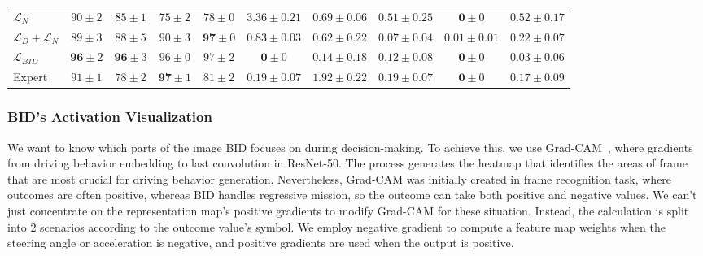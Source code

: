 \begin{table*}
\begin{tabular}{lccccccccc}
		$\mathcal{L}_N$
		& $90\pm2$ & $85\pm1$ & $75\pm2$  & $78\pm0$  
		& $3.36\pm0.21$ & $0.69\pm0.06$ & $0.51\pm0.25$  & $\mathbf{0}\pm0$  & $0.52\pm0.17$    \\
		$\mathcal{L}_D+\mathcal{L}_N$
		& $89 \pm 3$ & $88 \pm 5$  & $90 \pm 3$ & $\mathbf{97} \pm 0$  
		& $0.83 \pm 0.03$ & $0.62 \pm 0.22$ & $\mathbf{0.07} \pm 0.04$  &  $0.01 \pm 0.01$ & $0.22 \pm 0.07$    \\
		$\mathcal{L}_{BID}$
		& $\mathbf{96} \pm 2$ & $\mathbf{96} \pm 3$ & $96 \pm 0$ & $97 \pm 2$ 
		&  $\mathbf{0} \pm 0$ & $\mathbf{0.14} \pm 0.18$  & $0.12 \pm 0.08$  & $\mathbf{0} \pm 0$  & $\mathbf{0.03} \pm 0.06$  \\
		Expert
		& $91 \pm 1$ & $78 \pm 2$ & $\mathbf{97} \pm 1$ & $81 \pm 2$ 
		& $0.19 \pm 0.07$ & $1.92 \pm 0.22$  & $0.19 \pm 0.07$ & $\mathbf{0} \pm 0$ & $0.17 \pm 0.09$   \\
		\hline
	\end{tabular}
	\vspace{-1ex}
	\vspace{-2.5ex}
	\label{table:infraction}
\end{table*}


\subsubsection{BID's Activation Visualization}
\label{sec:Visualization}
\hspace{1pc}We want to know which parts of the image BID focuses on during decision-making. 
To achieve this, we use Grad-CAM~\cite{Selvaraju:2017}, where gradients from driving behavior embedding to last convolution in ResNet-50. 
The process generates the heatmap that identifies the areas of frame that are most crucial for driving behavior generation. 
Nevertheless, Grad-CAM was initially created in frame recognition task, where outcomes are often positive, whereas BID handles regressive mission, so the outcome can take both positive and negative values.
We can't just concentrate on the representation map's positive gradients to modify Grad-CAM for these situation.
Instead, the calculation is split into 2 scenarios according to the outcome value's symbol. 
We employ negative gradient to compute a feature map weights when the steering angle or acceleration is negative, and positive gradients are used when the output is positive.


